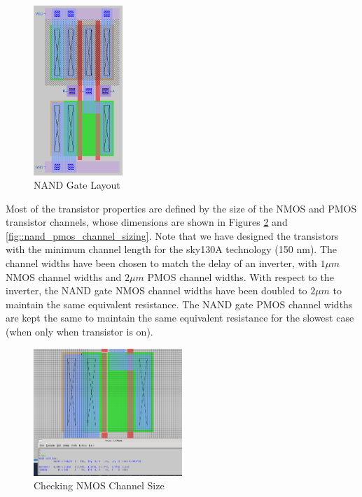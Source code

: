 \documentclass{article}
\begin{document}
	\begin{figure}[H]
		\centerline{\includegraphics[width=0.3\textwidth]{nand_layout.png}}
		\caption{NAND Gate Layout}
		\label{fig::nand_layout}
	\end{figure}

	Most of the transistor properties are defined by the size of the NMOS and PMOS transistor channels, whose dimensions are shown in Figures \ref{fig::nand_nmos_channel_sizing} and \ref{fig::nand_pmos_channel_sizing}. Note that we have designed the transistors with the minimum channel length for the sky130A technology (150 nm). The channel widths have been chosen to match the delay of an inverter, with $1 {\mu}m$ NMOS channel widths and $2 {\mu}m$ PMOS channel widths. With respect to the inverter, the NAND gate NMOS channel widths have been doubled to $2 {\mu}m$ to maintain the same equivalent resistance. The NAND gate PMOS channel widths are kept the same to maintain the same equivalent resistance for the slowest case (when only when transistor is on).
	
	\begin{figure}[H]
		\centerline{\includegraphics[width=0.5\textwidth]{nand_nmos_channel_sizing.png}}
		\caption{Checking NMOS Channel Size}
		\label{fig::nand_nmos_channel_sizing}
	\end{figure}
	
\end{document}
